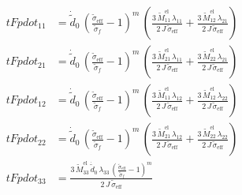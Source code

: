 \begin{align}
tFpdot_{11} &= \dot{\tilde{d}}_{0}\,{\left(\frac{\tilde{\sigma }_{\mathrm{eff}}}{\tilde{\sigma }_{f}}-1\right)}^m\,\left(\frac{3\,\tilde{M}_{11}^{\mathrm{el}}\,\lambda _{11}}{2\,J\,\tilde{\sigma }_{\mathrm{eff}}}+\frac{3\,\tilde{M}_{12}^{\mathrm{el}}\,\lambda _{21}}{2\,J\,\tilde{\sigma }_{\mathrm{eff}}}\right) \\ 
tFpdot_{21} &= \dot{\tilde{d}}_{0}\,{\left(\frac{\tilde{\sigma }_{\mathrm{eff}}}{\tilde{\sigma }_{f}}-1\right)}^m\,\left(\frac{3\,\tilde{M}_{21}^{\mathrm{el}}\,\lambda _{11}}{2\,J\,\tilde{\sigma }_{\mathrm{eff}}}+\frac{3\,\tilde{M}_{22}^{\mathrm{el}}\,\lambda _{21}}{2\,J\,\tilde{\sigma }_{\mathrm{eff}}}\right) \\ 
tFpdot_{12} &= \dot{\tilde{d}}_{0}\,{\left(\frac{\tilde{\sigma }_{\mathrm{eff}}}{\tilde{\sigma }_{f}}-1\right)}^m\,\left(\frac{3\,\tilde{M}_{11}^{\mathrm{el}}\,\lambda _{12}}{2\,J\,\tilde{\sigma }_{\mathrm{eff}}}+\frac{3\,\tilde{M}_{12}^{\mathrm{el}}\,\lambda _{22}}{2\,J\,\tilde{\sigma }_{\mathrm{eff}}}\right) \\ 
tFpdot_{22} &= \dot{\tilde{d}}_{0}\,{\left(\frac{\tilde{\sigma }_{\mathrm{eff}}}{\tilde{\sigma }_{f}}-1\right)}^m\,\left(\frac{3\,\tilde{M}_{21}^{\mathrm{el}}\,\lambda _{12}}{2\,J\,\tilde{\sigma }_{\mathrm{eff}}}+\frac{3\,\tilde{M}_{22}^{\mathrm{el}}\,\lambda _{22}}{2\,J\,\tilde{\sigma }_{\mathrm{eff}}}\right) \\ 
tFpdot_{33} &= \frac{3\,\tilde{M}_{33}^{\mathrm{el}}\,\dot{\tilde{d}}_{0}\,\lambda _{33}\,{\left(\frac{\tilde{\sigma }_{\mathrm{eff}}}{\tilde{\sigma }_{f}}-1\right)}^m}{2\,J\,\tilde{\sigma }_{\mathrm{eff}}} 
\end{align}
